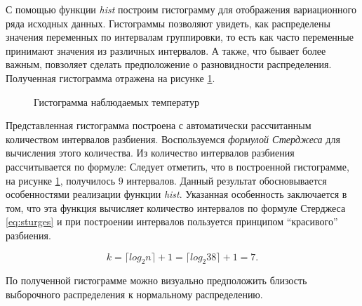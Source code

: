 С помощью функции \textit{hist} построим гистограмму для отображения вариационного ряда исходных данных. Гистограммы позволяют увидеть, как распределены значения переменных по интервалам группировки, то есть как часто переменные принимают значения из различных интервалов. А также, что бывает более важным, повзоляет сделать предположение о разновидности распределения. Полученная гистограмма отражена на рисунке \ref{img:histogram}. 
\begin{figure}[ht]
\caption{Гистограмма наблюдаемых температур}
\label{img:histogram}
\end{figure}

Представленная гистограмма построена с автоматически рассчитанным количеством интервалов разбиения. Воспользуемся \textit{формулой Стерджеса} для вычисления этого количества. Из \cite{Sturges1926Choice} количество интервалов разбиения рассчитывается по формуле:
Следует отметить, что в построенной гистограмме, на рисунке \ref{img:histogram}, получилось $9$ интервалов. Данный результат обосновывается особенностями реализации функции \textit{hist}. Указанная особенность заключается в том, что эта функция вычисляет количество интервалов по формуле Стерджеса \eqref{eq:sturges} и при построении интервалов пользуется принципом ``красивого'' разбиения.

\begin{equation}
\label{eq:sturges}
	k = \lceil log_{2}n \rceil + 1 = \lceil log_{2}38 \rceil + 1 = 7.
\end{equation}

По полученной гистограмме можно визуально предположить близость выборочного распределения к нормальному распределению.

